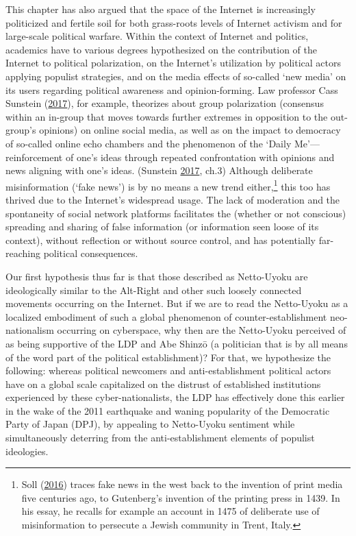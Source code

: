 \documentclass[10pt,british,A4paper,twoside]{memoir}
\begin{document}
This chapter has also argued that the space of the Internet is
increasingly politicized and fertile soil for both grass-roots levels of
Internet activism and for large-scale political warfare. Within the context
of Internet and politics, academics have to various degrees hypothesized
on the contribution of the Internet to political polarization, on the
Internet's utilization by political actors applying populist strategies,
and on the media effects of so-called `new media' on its users regarding
political awareness and opinion-forming. Law professor Cass Sunstein
(\protect\hyperlink{ref-sunstein_republic:_2017}{2017}), for example,
theorizes about group polarization (consensus within an in-group that
moves towards further extremes in opposition to the out-group's
opinions) on online social media, as well as on the impact to democracy
of so-called online echo chambers and the phenomenon of the `Daily
Me'---reinforcement of one's ideas through repeated confrontation with
opinions and news aligning with one's ideas. (Sunstein
\protect\hyperlink{ref-sunstein_republic:_2017}{2017}, ch.3) Although
deliberate misinformation (`fake news') is by no means a new trend
either,\footnote{Soll (\protect\hyperlink{ref-soll_long_2016}{2016})
  traces fake news in the west back to the invention of print media five
  centuries ago, to Gutenberg's invention of the printing press in 1439.
  In his essay, he recalls for example an account in 1475 of deliberate
  use of misinformation to persecute a Jewish community in Trent, Italy.}
this too has thrived due to the Internet's widespread usage. The lack of
moderation and the spontaneity of social network platforms facilitates
the (whether or not conscious) spreading and sharing of false information (or
information seen loose of its context), without reflection or without
source control, and has potentially far-reaching political consequences.

Our first hypothesis thus far is that those described as Netto-Uyoku are
ideologically similar to the Alt-Right and other such loosely connected
movements occurring on the Internet. But if we are to read the
Netto-Uyoku as a localized embodiment of such a global phenomenon of
counter-establishment neo-nationalism occurring on cyberspace, why then
are the Netto-Uyoku perceived of as being supportive of the LDP and Abe
Shinzō (a politician that is by all means of the word part of the
political establishment)? For that, we hypothesize the following:
whereas political newcomers and anti-establishment political actors have on a global
scale capitalized on the distrust of established institutions
experienced by these cyber-nationalists, the LDP has effectively done
this earlier in the wake of the 2011 earthquake and waning popularity of
the Democratic Party of Japan (DPJ), by appealing to Netto-Uyoku
sentiment while simultaneously deterring from the anti-establishment
elements of populist ideologies.
\end{document}
